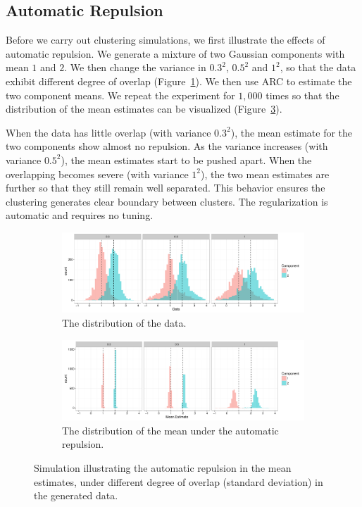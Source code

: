 \documentclass[12pt]{article}
\begin{document}
\subsection{Automatic Repulsion}

Before we carry out clustering simulations, we first illustrate the effects of automatic repulsion. We generate a mixture of two Gaussian components with mean $1$ and $2$. We then change the variance in $0.3^2$, $0.5^2$ and $1^2$, so that the data exhibit different degree of overlap (Figure~\ref{fig:simRepulY}). We then use ARC to estimate the two component means. We repeat the experiment for $1,000$ times so that the distribution of the mean estimates can be visualized  (Figure~\ref{fig:simRepulM}).

 When the data has little overlap (with variance  $0.3^2$), the mean estimate for the two components show almost no repulsion. As the variance increases (with variance  $0.5^2$), the mean estimates start to be pushed apart. When the overlapping becomes severe  (with variance  $1^2$), the two mean estimates are further  so that they still remain well separated. This behavior ensures the clustering generates clear boundary between clusters. The regularization is automatic and requires no tuning.



\begin{figure}[H]
 \centering
  \begin{subfigure}[b]{1\textwidth}
 \includegraphics[width=1\textwidth]{pics/repulData}
  \caption{The distribution of the data.}
\label{fig:simRepulY}
\end{subfigure}
  \hfill
   \begin{subfigure}[b]{1\textwidth}
 \includegraphics[width=1\textwidth]{pics/repulMean}
  \caption{The distribution of the mean under the automatic repulsion.}
  \label{fig:simRepulM}
\end{subfigure}
\caption{Simulation illustrating the automatic repulsion in the mean estimates, under different degree of overlap (standard deviation) in the generated data.}
 \end{figure}
\end{document}
